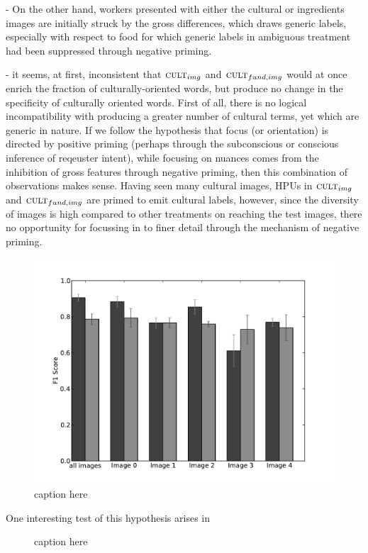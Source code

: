 \documentclass[letterpaper, 11pt, twocolumn]{article}
\begin{document}
- On the other hand, workers presented with either the cultural or ingredients images are initially struck by the gross differences, which draws generic 
labels, especially with respect to food for which generic labels in ambiguous treatment had been suppressed through negative priming.

- it seems, at first, inconsistent that $\textsc{cult}_{img}$ and 
$\textsc{cult}_{fund,img}$ would at once enrich the fraction of 
culturally-oriented words, but produce no change in the specificity of 
culturally oriented words.  First of all, there is no logical incompatibility
with producing a greater number of cultural terms, yet which are generic 
in nature.  If we follow the hypothesis that focus (or orientation) is directed
by positive priming (perhaps through the subconscious or conscious inference
of reqeuster intent), while focusing on nuances comes from the inhibition
of gross features through negative priming, then this combination of observations makes sense.  Having seen many cultural images, HPUs in 
$\textsc{cult}_{img}$ and $\textsc{cult}_{fund,img}$ are primed to emit 
cultural labels, however, since the diversity of images is high compared to
other treatments on reaching the test images, there no opportunity for 
focussing in to finer detail through the mechanism of negative priming.

\begin{figure}
	\includegraphics[scale=0.4]{../figs/longitude0.pdf}
	\caption{caption here}
	\label{fig:longitude}
\end{figure}


One interesting test of this hypothesis arises in 
\begin{figure}
	\caption{caption here}
	\label{fig:testImages}
\end{figure}
\end{document}

